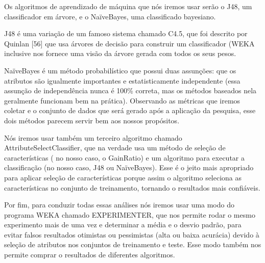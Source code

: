 Os algoritmos de aprendizado de máquina que nós iremos usar serão o J48, um classificador em árvore, e o NaïveBayes, uma classificado bayesiano.

J48 é uma variação de um famoso sistema chamado C4.5, que foi descrito por Quinlan [56] que usa árvores de decisão para construir um classificador (WEKA inclusive nos fornece uma visão da árvore gerada com todos os seus pesos.

NaïveBayes é um método probabilístico que possui duas assunções: que os atributos são igualmente importantes e estatisticamente independente (essa assunção de independência nunca é 100\% correta, mas os métodos baseados nela geralmente funcionam bem na prática). Observando as métricas que iremos coletar e o conjunto de dados que será gerado após a aplicação da pesquisa, esse dois métodos parecem servir bem aos nossos propósitos.

Nós iremos usar também um terceiro algoritmo chamado AttributeSelectClassifier, que na verdade usa um método de seleção de características ( no nosso caso, o GainRatio) e um algoritmo para executar a classificação (no nosso caso, J48 ou NaïveBayes). Esse é o jeito mais apropriado para aplicar seleção de características porque assim o algoritmo seleciona as características no conjunto de treinamento, tornando o resultados mais confiáveis.

Por fim, para conduzir todas essas análises nós iremos usar uma modo do programa WEKA chamado EXPERIMENTER, que nos permite rodar o mesmo experimento mais de uma vez e determinar a média e o desvio padrão, para evitar falsos resultados otimistas ou pessimistas (alta ou baixa acurácia) devido à seleção de atributos nos conjuntos de treinamento e teste. Esse modo também nos permite comprar o resultados de diferentes algoritmos.






















